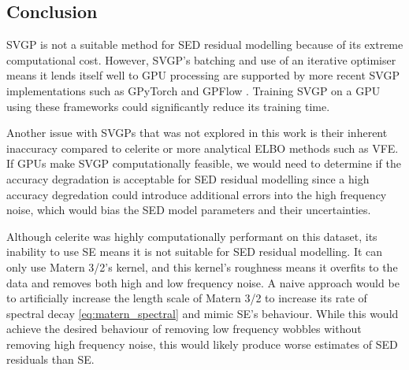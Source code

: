\subsection{Conclusion}
SVGP is not a suitable method for SED residual modelling because of its extreme computational cost. However, SVGP's batching and use of an iterative optimiser means it lends itself well to GPU processing are supported by more recent SVGP implementations such as GPyTorch \cite{gpytorch} and GPFlow \cite{gpflow}. Training SVGP on a GPU using these frameworks could significantly reduce its training time. 

Another issue with SVGPs that was not explored in this work is their inherent inaccuracy compared to celerite or more analytical ELBO methods such as VFE. If GPUs make SVGP computationally feasible, we would need to determine if the accuracy degradation is acceptable for SED residual modelling since a high accuracy degredation could introduce additional errors into the high frequency noise, which would bias the SED model parameters and their uncertainties.

Although celerite was highly computationally performant on this dataset, its inability to use SE means it is not suitable for SED residual modelling. It can only use Matern 3/2's kernel, and this kernel's roughness means it overfits to the data and removes both high and low frequency noise. A naive approach would be to artificially increase the length scale of Matern 3/2 to increase its rate of spectral decay \ref{eq:matern_spectral} and mimic SE's behaviour. While this would achieve the desired behaviour of removing low frequency wobbles without removing high frequency noise, this would likely produce worse estimates of SED residuals than SE.

